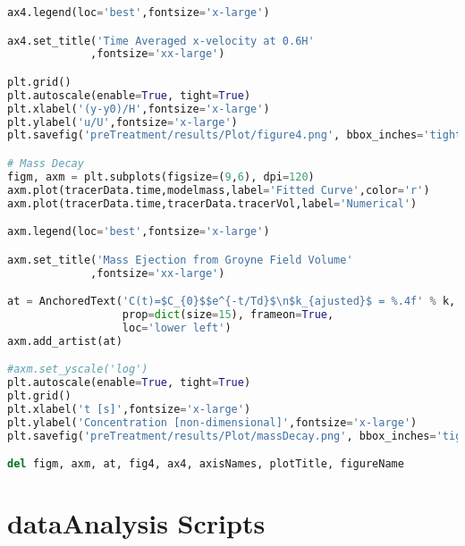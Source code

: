 \begin{lstlisting}[language=python]
ax4.legend(loc='best',fontsize='x-large')

ax4.set_title('Time Averaged x-velocity at 0.6H'
             ,fontsize='xx-large')

plt.grid()
plt.autoscale(enable=True, tight=True)
plt.xlabel('(y-y0)/H',fontsize='x-large')
plt.ylabel('u/U',fontsize='x-large')
plt.savefig('preTreatment/results/Plot/figure4.png', bbox_inches='tight')

# Mass Decay
figm, axm = plt.subplots(figsize=(9,6), dpi=120)
axm.plot(tracerData.time,modelmass,label='Fitted Curve',color='r')
axm.plot(tracerData.time,tracerData.tracerVol,label='Numerical')

axm.legend(loc='best',fontsize='x-large')

axm.set_title('Mass Ejection from Groyne Field Volume'
             ,fontsize='xx-large')

at = AnchoredText('C(t)=$C_{0}$$e^{-t/Td}$\n$k_{ajusted}$ = %.4f' % k,
                  prop=dict(size=15), frameon=True,
                  loc='lower left')
axm.add_artist(at)

#axm.set_yscale('log')
plt.autoscale(enable=True, tight=True)
plt.grid()
plt.xlabel('t [s]',fontsize='x-large')
plt.ylabel('Concentration [non-dimensional]',fontsize='x-large')
plt.savefig('preTreatment/results/Plot/massDecay.png', bbox_inches='tight')

del figm, axm, at, fig4, ax4, axisNames, plotTitle, figureName

\end{lstlisting}
\section{dataAnalysis Scripts}
